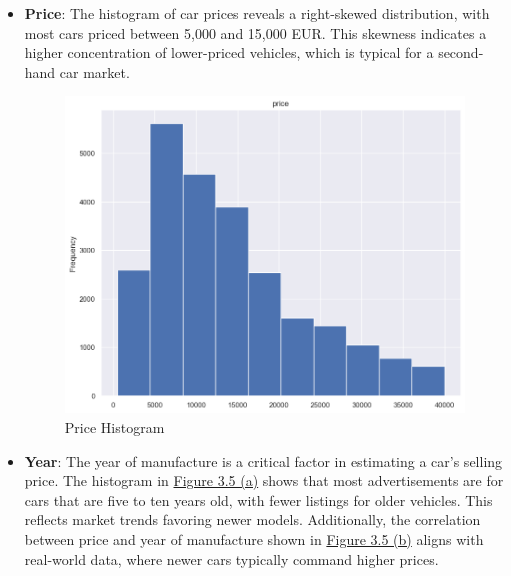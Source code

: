 \begin{itemize}
    \item \textbf{Price}: The histogram of car prices reveals a right-skewed distribution, with most cars priced between 5,000 and 15,000 EUR. This skewness indicates a higher concentration of lower-priced vehicles, which is typical for a second-hand car market.

    \begin{figure}[!h]
        \centering
        \includegraphics[width=0.5\linewidth]{images/priceprediction/after_outliers/price.png}
        \caption{Price Histogram}
        \label{fig:price-hist}
    \end{figure}

    \item \textbf{Year}: The year of manufacture is a critical factor in estimating a car's selling price. The histogram in \hyperref[fig:year-hist]{Figure 3.5 (a)} shows that most advertisements are for cars that are five to ten years old, with fewer listings for older vehicles. This reflects market trends favoring newer models. Additionally, the correlation between price and year of manufacture shown in \hyperref[fig:year-box]{Figure 3.5 (b)} aligns with real-world data, where newer cars typically command higher prices.
    

\end{itemize}
